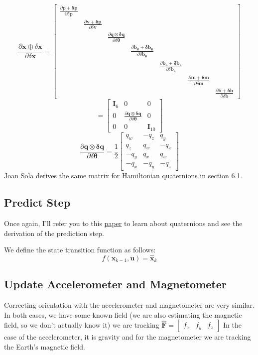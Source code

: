 \documentclass[11pt]{article}
\renewcommand{\vec}[1]{\mathbf{#1}}
\renewcommand{\tilde}[1]{\expandafter\hat{#1}}
\newcommand{\mat}[1]{\mathbf{#1}}
\begin{document}
$$\frac{\partial \vec{x} \oplus \delta \vec{x}}{\partial \delta \vec{x}} = \begin{bmatrix}
\frac{\partial \vec{p+\delta p}}{\partial \delta \vec{p}}\\
& \frac{\partial \vec{v+\delta p}}{\partial \delta \vec{v}} \\
& & \frac{\partial \vec{q \otimes \delta q}}{\partial \delta \vec{\theta}}\\
& & & \frac{\partial \vec{b_g+\delta b_g}}{\partial \delta \vec{b_g}}\\
& & & & \frac{\partial \vec{b_a+\delta b_a}}{\partial \delta \vec{b_a}}\\
& & & & & \frac{\partial \vec{m+\delta m}}{\partial \delta \vec{m}}\\
& & & & & & \frac{\partial \vec{b+\delta b}}{\partial \delta \vec{b}}
\end{bmatrix}$$
$$ = \begin{bmatrix}
\mat{I}_6 & 0 & 0 \\
0 & \frac{\partial \vec{q \otimes \delta q}}{\partial \delta \vec{\theta}} & 0 \\
0 & 0 & \mat{I}_{10}
\end{bmatrix}
$$
$$
\frac{\partial \vec{q\otimes \delta q}}{\partial \delta \vec{\theta}} = \frac{1}{2}\begin{bmatrix}
q_w & -q_z & q_y\\
q_z & q_w & -q_x\\
-q_y & q_x & q_w\\
-q_x & -q_y & -q_z
\end{bmatrix} $$
Joan Sola derives the same matrix for Hamiltonian quaternions in section 6.1.
\subsection{Predict Step}
Once again, I'll refer you to this \href{http://www.iri.upc.edu/people/jsola/JoanSola/objectes/notes/kinematics.pdf}{paper} to learn about quaternions and see the derivation of the prediction step.

We define the state transition function as follows:
$$f(\vec{x}_{k-1}, \vec{u}) = \tilde{\vec{x}}_k$$

\subsection{Update Accelerometer and Magnetometer}
Correcting orientation with the accelerometer and magnetometer are very similar. In both cases, we have some known field (we are also estimating the magnetic field, so we don't actually know it) we are tracking $\hat{\vec{F}} = \begin{bmatrix}
f_x & f_y & f_z
\end{bmatrix}$ In the case of the accelerometer, it is gravity and for the magnetometer we are tracking the Earth's magnetic field.
	
\end{document}
